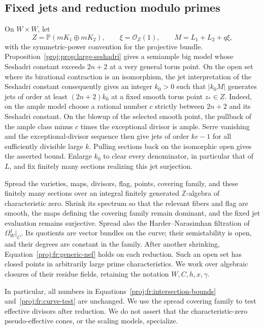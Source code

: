 \documentclass[11pt,letterpaper]{article}
\theoremstyle{definition}
\theoremstyle{remark}
\begin{document}
\subsection{Fixed jets and reduction modulo primes}

On \(W\times W\), let
\[
 Z=\mathbb{P}(mK_1\oplus mK_2),\qquad
 \xi=\mathcal{O}_Z(1),\qquad
 M=L_1+L_2+q\xi,
\]
with the symmetric-power convention for the projective bundle.
Proposition~\ref{proj:prop:large-seshadri} gives a semiample big model whose
Seshadri constant exceeds \(2n+2\) at a very general torus point.
On the open set where its birational contraction is an isomorphism,
the jet interpretation of the Seshadri constant consequently gives
an integer \(k_0>0\) such that \(|k_0M|\) generates jets of order
at least \((2n+2)k_0\) at a fixed smooth torus point \(z_*\in Z\).
Indeed, on the ample model choose a rational number \(c\) strictly
between \(2n+2\) and its Seshadri constant. On the blowup of the
selected smooth point, the pullback of the ample class minus \(c\)
times the exceptional divisor is ample. Serre vanishing and the
exceptional-divisor sequence then give jets of order \(kc-1\) for
all sufficiently divisible large \(k\). Pulling sections back on the
isomorphic open gives the asserted bound.
Enlarge \(k_0\) to clear every denominator, in particular that of \(L\),
and fix finitely many sections realizing this jet surjection.

Spread the varieties, maps, divisors, flag, points, covering family,
and these finitely many sections over an integral finitely generated
\(\mathbb{Z}\)-algebra of characteristic zero. Shrink its spectrum so that the
relevant fibers and flag are smooth, the maps defining the covering
family remain dominant, and the fixed jet evaluation remains
surjective. Spread also the Harder--Narasimhan filtration of
\(\Omega_W^1|_C\). Its quotients are vector bundles on the curve; their
semistability is open, and their degrees are constant in the family.
After another shrinking, Equation~\eqref{proj:fr:generic-nef} holds on each
reduction. Such an open set has closed points in arbitrarily large
prime characteristics. We work over algebraic closures of their
residue fields, retaining the notation \(W,C,h,x,\gamma\).

In particular, all numbers in
Equations~\eqref{proj:fr:intersection-bounds} and~\eqref{proj:fr:curve-test}
are unchanged. We use the spread covering family to test effective
divisors after reduction. We do not assert that the characteristic-zero
pseudo-effective cones, or the scaling models, specialize.
\end{document}
